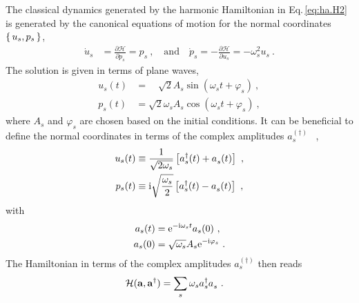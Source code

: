 The classical dynamics generated by the harmonic Hamiltonian in Eq.\,\eqref{eq:ha.H2} is generated by the canonical equations of motion for the normal coordinates $\set{ u_s, p_s}$,
\begin{align}
\dot{u}_s
& = \frac{\partial \mathcal H}{\partial p_s}
= p_s~,\quad\text{and}\quad
\dot{p}_s
= - \frac{\partial \mathcal H}{\partial u_s}
= - \omega^2_s u_s~.
\end{align}
The solution is given in terms of plane waves,
\begin{subequations}
	\begin{align}
	u_s (t) 
	&= \phantom{\omega_s} \sqrt 2 A_s \sin (\omega_s t + \varphi_s)~,\\
	p_s (t) 
	&= \sqrt 2 \omega_s A_s \cos (\omega_s t + \varphi_s)~,
	\end{align}
\end{subequations}
where $A_s$ and $\varphi_s$ are chosen based on the initial conditions. It can be beneficial to define the normal coordinates in terms of the complex amplitudes $a^{(\dagger)}_s$ ~, 
\begin{subequations}
	\label{eq:u_s.amplitudes}
	\begin{align}
	u_s (t) 
	&\equiv \frac{1}{\sqrt{2 \omega_s}} \left[ \D a_s (t) + \fD a_s (t) \right]~, \\
	p_s (t) 
	&\equiv \im \sqrt{\frac{\omega_s}{2}} \left[ \D a_s (t) - \fD a_s (t) \right]~,
	\end{align}
\end{subequations}
with %
\begin{subequations}
	\label{eq:a_s(t)}
	\begin{align}
	a_s (t) 
	& = {\rm e}^{- {\rm i} \omega_s t} a_s (0)~, \\
	a_s (0)
	& = \sqrt{\omega_s} A_s {\rm e}^{- {\rm i} \varphi_s}~.
	\end{align}
\end{subequations}
The Hamiltonian in terms of the complex amplitudes $a^{(\dagger)}_s$ then reads
\begin{align}
\mathcal{H}(\b a, \D{\b a})
&= \sum_s \omega_s \D a_s\fD  a_s~.
\label{eq:Hamiltonian.aa}
\end{align}

